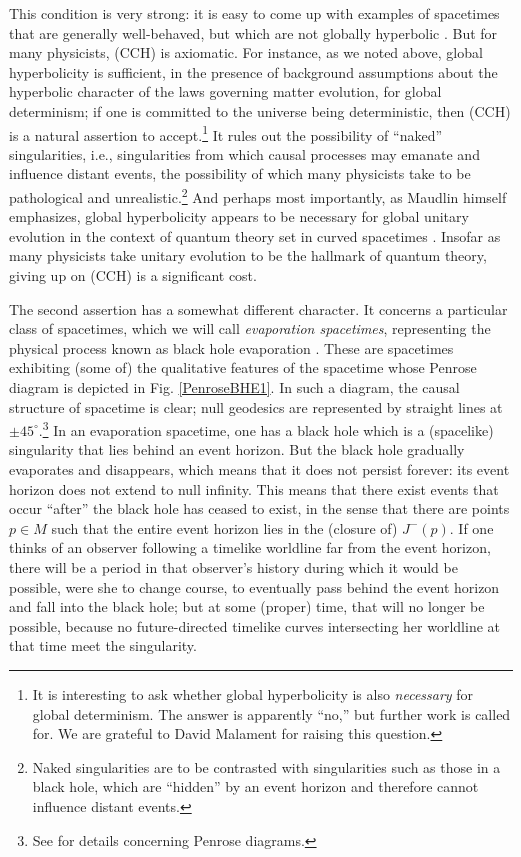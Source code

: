 \documentclass[authoryear,12pt,3p]{jowarticle}
\begin{document}
This condition is very strong: it is easy to come up with examples of spacetimes that are generally well-behaved, but which are not globally hyperbolic \citep[Ch. 2]{Earman}.  But for many physicists, (CCH) is axiomatic.  For instance, as we noted above, global hyperbolicity is sufficient, in the presence of background assumptions about the hyperbolic character of the laws governing matter evolution, for global determinism; if one is committed to the universe being deterministic, then (CCH) is a natural assertion to accept.\footnote{It is interesting to ask whether global hyperbolicity is also \emph{necessary} for global determinism.  The answer is apparently ``no,'' but further work is called for.  We are grateful to David Malament for raising this question.}  It rules out the possibility of ``naked'' singularities, i.e., singularities from which causal processes may emanate and influence distant events, the possibility of which many physicists take to be pathological and unrealistic.\footnote{Naked singularities are to be contrasted with singularities such as those in a black hole, which are ``hidden'' by an event horizon and therefore cannot influence distant events.}  And perhaps most importantly, as Maudlin himself emphasizes, global hyperbolicity appears to be necessary for global unitary evolution in the context of quantum theory set in curved spacetimes \citep{Belot+etal}.  Insofar as many physicists take unitary evolution to be the hallmark of quantum theory, giving up on (CCH) is a significant cost.

The second assertion has a somewhat different character.  It concerns a particular class of spacetimes, which we will call \emph{evaporation spacetimes}, representing the physical process known as black hole evaporation \citep{HawkingR1,HawkingR2}.  These are spacetimes exhibiting (some of) the qualitative features of the spacetime whose Penrose diagram is depicted in Fig. \ref{PenroseBHE1}.  In such a diagram, the causal structure of spacetime is clear; null geodesics are represented by straight lines at $\pm 45^\circ$.\footnote{See \cite{Hawking+Ellis} for details concerning Penrose diagrams.} In an evaporation spacetime, one has a black hole which is a (spacelike) singularity that lies behind an event horizon.  But the black hole gradually evaporates and disappears, which means that it does not persist forever: its event horizon does not extend to null infinity.  This means that there exist events that occur ``after'' the black hole has ceased to exist, in the sense that there are points $p\in M$ such that the entire event horizon lies in the (closure of) $J^-(p)$. If one thinks of an observer following a timelike worldline far from the event horizon, there will be a period in that observer's history during which it would be possible, were she to change course, to eventually pass behind the event horizon and fall into the black hole; but at some (proper) time, that will no longer be possible, because no future-directed timelike curves intersecting her worldline at that time meet the singularity.
\end{document}
